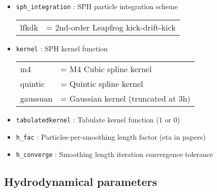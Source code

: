 \documentclass[a4paper]{article}
\newcommand{\var}[1]{\texttt{#1}}
\begin{document}
\begin{itemize}

\item \var{sph\_integration} : SPH particle integration scheme \\
\begin{tabular}{ll}
lfkdk   & = 2nd-order Leapfrog kick-drift-kick
\end{tabular}

\item \var{kernel} : SPH kernel function \\
\begin{tabular}{ll}
m4        & = M4 Cubic spline kernel \\
quintic   & = Quintic spline kernel \\
gaussuan  & = Gaussian kernel (truncated at 3h)
\end{tabular}

\item \var{tabulatedkernel} : Tabulate kernel function  ($1$ or $0$)

\item \var{h\_fac}     : Particles-per-smoothing length factor (eta in papers)

\item \var{h\_converge} : Smoothing length iteration convergence tolerance

\end{itemize}


\subsection{Hydrodynamical parameters}
\end{document}
